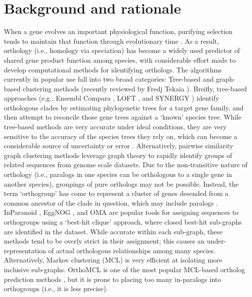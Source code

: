 \documentclass[twocolumn]{bmcart}%
\begin{document}
\section{Background and rationale}
When a gene evolves an important physiological function, purifying selection tends to maintain that function through evolutionary time \cite{Altenhoff:2012ea, Rogozin:2014fp, KryuchkovaMostacci:2016iw}. As a result, orthology (i.e., homology via speciation) has become a widely used predictor of shared gene product function among species, with considerable effort made to develop computational methods for identifying orthologs. The algorithms currently in popular use fall into two broad categories: Tree-based and graph-based clustering methods (recently reviewed by Fredj Tekaia \cite{Tekaia:2016ga}). Breifly, tree-based approaches (e.g., Ensembl Compara \cite{Vilella:2009ju}, LOFT \cite{vanderHeijden:2007bo}, and SYNERGY \cite{Wapinski:2007fa}) identify orthologous clades by estimating phylogenetic trees for a target gene family, and then attempt to reconcile those gene trees against a `known' species tree. While tree-based methods are very accurate under ideal conditions, they are very sensitive to the accuracy of the species trees they rely on, which can become a considerable source of uncertainty or error \cite{Xu:2016ek}. Alternatively, pairwise similarity graph clustering methods leverage graph theory to rapidly identify groups of related sequences from genome scale datasets. Due to the non-transitive nature of orthology (i.e., paralogs in one species can be orthologous to a single gene in another species), groupings of pure orthologs may not be possible. Instead, the term `orthogroup' has come to represent a cluster of genes desended from a common ancestor of the clade in question, which may include paralogs \cite{Wapinski:2007fa}. InParanoid \cite{OBrien:2005cy}, EggNOG \cite{Jensen:2007cc}, and OMA \cite{Roth:2009iu} are popular tools for assigning sequences to orthogroups using a `best-hit clique' approach, where closed best-hit sub-graphs are identified in the dataset. While accurate within each sub-graph, these methods tend to be overly strict in their assignment; this causes an under-representation of actual orthologous relationships among many species. Alternatively, Markov clustering (MCL) is very efficient at isolating more inclusive sub-graphs. OrthoMCL is one of the most popular MCL-based ortholog prediction methods \cite{Li:2003en}, but it is prone to placing too many in-paralogs into orthogroups (i.e., it is less precise).
\end{document}
